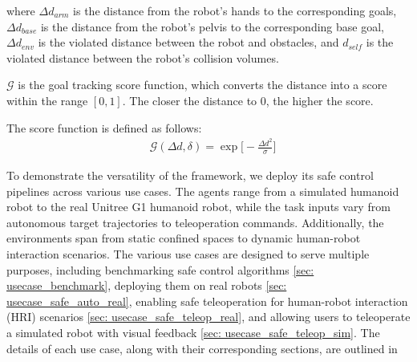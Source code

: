 where $\Delta d_{arm}$ is the distance from the robot's hands to the corresponding goals, $\Delta d_{base}$ is the distance from the robot's pelvis to the corresponding base goal, $\Delta d_{env}$ is the violated distance between the robot and obstacles, and $d_{self}$ is the violated distance between the robot's collision volumes. 

$\mathcal{G}$ is the goal tracking score function, which converts the distance into a score within the range $[0, 1]$. The closer the distance to $0$, the higher the score. 

The score function is defined as follows:
\begin{align}
    &\mathcal{G}(\Delta d, \delta) = 
    \exp\bigg[-\frac{\Delta d^2}{\sigma}\bigg]
\end{align}


To demonstrate the versatility of the \spark framework, we deploy its safe control pipelines across various use cases. 
The agents range from a simulated humanoid robot to the real Unitree G1 humanoid robot, while the task inputs vary from autonomous target trajectories to teleoperation commands. Additionally, the environments span from static confined spaces to dynamic human-robot interaction scenarios. 
The various use cases are designed to serve multiple purposes, including benchmarking safe control algorithms \ref{sec: usecase_benchmark}, deploying them on real robots \ref{sec: usecase_safe_auto_real}, enabling safe teleoperation for human-robot interaction (HRI) scenarios \ref{sec: usecase_safe_teleop_real}, and allowing users to teleoperate a simulated robot with visual feedback \ref{sec: usecase_safe_teleop_sim}. The details of each use case, along with their corresponding sections, are outlined in 




